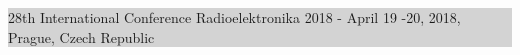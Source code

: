 \documentclass[landscape]{a0poster}
\begin{document}
\vspace{+3ex}
\hspace{-7ex}
\noindent\colorbox{lightgray} {
\hspace{+5ex}
\begin{minipage}[b]{1.1\linewidth}
\vspace{+4ex}

\color{gray} \huge{
28th International Conference Radioelektronika 2018 - April 19 -20, 2018, Prague, Czech Republic
}\\ %


\end{minipage}
}
\end{document}
